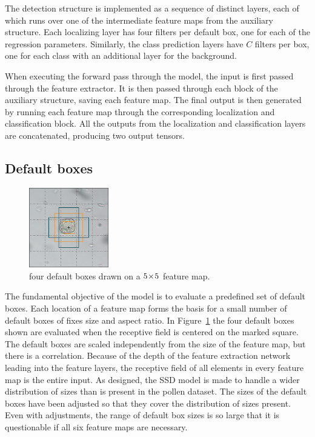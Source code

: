 The detection structure is implemented as a sequence of distinct layers, each of which runs over one of the intermediate feature maps from the auxiliary structure.
Each localizing layer has four filters per default box, one for each of the regression parameters.
Similarly, the class prediction layers have \(C\) filters per box, one for each class with an additional layer for the background.

When executing the forward pass through the model, the input is first passed through the feature extractor. It is then passed through each block of the auxiliary structure, saving each feature map.
The final output is then generated by running each feature map through the corresponding localization and classification block.
All the outputs from the localization and classification layers are concatenated, producing two output tensors.

\subsection{Default boxes}

\begin{figure}
  \centering
  \includegraphics[width=0.31\textwidth]{figs/method/default_boxes.png}
  \caption[Visualizing default boxes]{four default boxes drawn on a \(5\!\times \! 5 \) feature map.}\label{fig:defaults}
\end{figure}

The fundamental objective of the model is to evaluate a predefined set of default boxes.
Each location of a feature map forms the basis for a small number of default boxes of fixes size and aspect ratio.
In Figure~\ref{fig:defaults} the four default boxes shown are evaluated when the receptive field is centered on the marked square.
The default boxes are scaled independently from the size of the feature map, but there is a correlation.
Because of the depth of the feature extraction network leading into the feature layers, the receptive field of all elements in every feature map is the entire input. As designed, the SSD model is made to handle a wider distribution of sizes than is present in the pollen dataset.
The sizes of the default boxes have been adjusted so that they cover the distribution of sizes present.
Even with adjustments, the range of default box sizes is so large that it is questionable if all six feature maps are necessary.

